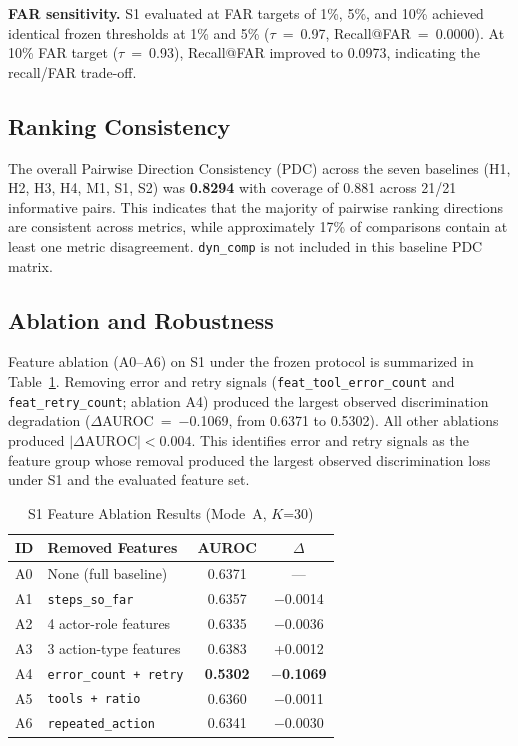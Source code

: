 \documentclass[conference,letterpaper]{IEEEtran}
\begin{document}
\textbf{FAR sensitivity.} S1 evaluated at FAR targets of 1\%, 5\%, and
10\% achieved identical frozen thresholds at 1\% and 5\% ($\tau$~=~0.97,
Recall@FAR~=~0.0000). At 10\% FAR target ($\tau$~=~0.93),
Recall@FAR improved to 0.0973, indicating the recall/FAR trade-off.

\subsection{Ranking Consistency}

The overall Pairwise Direction Consistency (PDC) across the seven
baselines (H1, H2, H3, H4, M1, S1, S2) was \textbf{0.8294} with
coverage of 0.881 across 21/21 informative pairs. This indicates that
the majority of pairwise ranking directions are consistent across
metrics, while approximately 17\% of comparisons contain at least one
metric disagreement. \texttt{dyn\_comp} is not included in this baseline
PDC matrix.

\subsection{Ablation and Robustness}

Feature ablation (A0--A6) on S1 under the frozen protocol is summarized
in Table~\ref{tab:ablation}. Removing error and retry signals
(\texttt{feat\_tool\_error\_count} and \texttt{feat\_retry\_count};
ablation A4) produced the largest observed discrimination degradation
($\Delta$AUROC~=~$-$0.1069, from 0.6371 to 0.5302). All other
ablations produced $|\Delta\mathrm{AUROC}| < 0.004$. This identifies
error and retry signals as the feature group whose removal produced
the largest observed discrimination loss under S1 and the evaluated
feature set.

\begin{table}[t]
\centering
\caption{S1 Feature Ablation Results (Mode~A, $K$=30)}
\label{tab:ablation}
\begin{tabular}{@{}llcc@{}}
\toprule
ID & Removed Features & AUROC & $\Delta$ \\
\midrule
A0 & None (full baseline) & 0.6371 & --- \\
A1 & \texttt{steps\_so\_far} & 0.6357 & $-$0.0014 \\
A2 & 4 actor-role features & 0.6335 & $-$0.0036 \\
A3 & 3 action-type features & 0.6383 & +0.0012 \\
A4 & \texttt{error\_count + retry} & \textbf{0.5302} & $-$\textbf{0.1069} \\
A5 & \texttt{tools + ratio} & 0.6360 & $-$0.0011 \\
A6 & \texttt{repeated\_action} & 0.6341 & $-$0.0030 \\
\bottomrule
\end{tabular}
\end{table}
\end{document}
